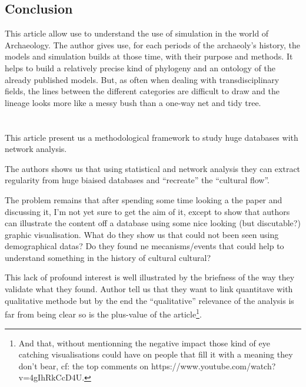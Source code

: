 \documentclass[a4paper]{article}
\begin{document}
\subsection{Conclusion}
This article allow use to understand the use of simulation in the world of Archaeology. The author gives use, for each periods of the archaeoly's history, the models and simulation builds at those time, with their purpose and methods. It helps to build a relatively precise kind of phylogeny and an ontology of the already published models.  But, as often when dealing with transdisciplinary fields, the lines between the different categories are difficult to draw and the lineage looks more like a messy bush than a one-way net and tidy tree.


\section{\cite{schich2014anetworkframeworkofculturalhistory}}
This article present us a methodological framework to study huge databases with network analysis. 

The authors shows us that using statistical and network analysis they can extract regularity from huge biaised databases and ``recreate'' the ``cultural flow''.

The problem remains that after spending some time looking a the paper and discussing it, I'm not yet sure to get the aim of it, except to show that authors can illustrate the content off a database using some nice looking (but discutable?) graphic visualisation. What do they show us that could not been seen using demographical datas? Do they found ne mecanisms/events that could help to understand something in the history of cultural cultural?

This lack of profound interest is well illustrated by the briefness of the way they validate what they found. Author tell us that they want to link quantitave with qualitative methode but by the end the ``qualitative'' relevance of the analysis is far from being clear so is the plus-value of the article\footnote{And that, without mentionning the negative impact those kind of eye catching visualisations could have on people that fill it with a meaning they don't bear, cf: the top comments on https://www.youtube.com/watch?v=4gIhRkCcD4U.}.




  
\end{document}
